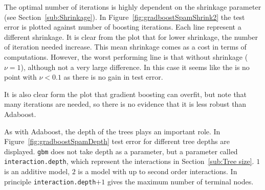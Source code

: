 The optimal number of iterations is highly dependent on the shrinkage parameter (see Section~\ref{sub:Shrinkage}). In Figure~\ref{fig:gradboostSpamShrink2} the test error is plotted against number of boosting iterations. Each line represent a different shrinkage. It is clear from the plot that for lower shrinkage, the number of iteration needed increase. This mean shrinkage comes as a cost in terms of computations. However, the worst performing line is that without shrinkage ($\nu = 1$), although not a very large difference. In this case it seems like the is no point with $\nu < 0.1$ as there is no gain in test error.

It is also clear form the plot that gradient boosting can overfit, but note that many iterations are needed, so there is no evidence that it is less robust than Adaboost.

As with Adaboost, the depth of the trees plays an important role. In Figure~\ref{fig:gradboostSpamDepth} test error for different tree depths are displayed. \verb+gbm+ does not take depth as a parameter, but a parameter called \verb+interaction.depth+, which represent the interactions in Section~\ref{sub:Tree size}. $1$ is an additive model, $2$ is a model with up to second order interactions. In principle \verb+interaction.depth+$+1$ gives the maximum number of terminal nodes.


